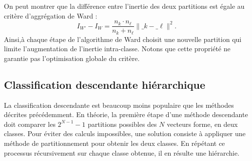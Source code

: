 On peut montrer que la diff\'erence entre l'inertie des deux partitions
est \'egale au crit\`ere d'aggr\'egation de Ward :
$$
I_{W'}-I_W = \frac{n_{k} \cdot n_{\ell}}{n_{k} + n_{\ell}}\|\bm_{k} - \bm_{\ell} \|^2.
$$
Ainsi,\`a chaque \'etape de l'algorithme de Ward choisit une
nouvelle partition qui limite l'augmentation de l'inertie intra-classe.
Notons que cette propri\'et\'e ne garantie pas
l'optimisation globale du crit\`ere.
\subsection{Classification descendante hi\'erarchique}

La classification descendante est beaucoup moins populaire que les
m\'ethodes d\'ecrites pr\'ec\'edemment. En th\'eorie, la premi\`ere
\'etape d'une m\'ethode descendante doit comparer les $2^{N-1}-1$ partitions
possibles des $N$ vecteurs forme, en deux classes. Pour \'eviter des 
calculs impossibles, une solution consiste \`a appliquer une m\'ethode 
de partitionnement pour obtenir les deux classes. En r\'ep\'etant
ce processus r\'ecursivement sur chaque classe obtenue, il en
r\'esulte une hi\'erarchie. 

  









